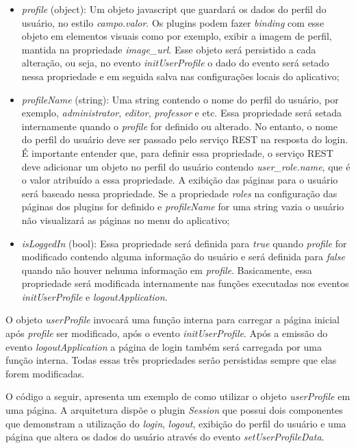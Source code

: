 \begin{itemize}
	\item \textit{profile} (object): Um objeto javascript que guardará os dados do perfil do usuário, no estilo \textit{campo.valor}. Os plugins podem fazer \textit{binding} com esse objeto em elementos visuais como por exemplo, exibir a imagem de perfil, mantida na propriedade \textit{image\_url}. Esse objeto será persistido a cada alteração, ou seja, no evento \textit{initUserProfile} o dado do evento será setado nessa propriedade e em seguida salva nas configurações locais do aplicativo;

	\item \textit{profileName} (string): Uma string contendo o nome do perfil do usuário, por exemplo, \textit{administrator}, \textit{editor}, \textit{professor} e etc. Essa propriedade será setada internamente quando o \textit{profile} for definido ou alterado. No entanto, o nome do perfil do usuário deve ser passado pelo serviço REST na resposta do login. É importante entender que, para definir essa propriedade, o serviço REST deve adicionar um objeto no perfil do usuário contendo \textit{user\_role.name}, que é o valor atribuído a essa propriedade. A exibição das páginas para o usuário será baseado nessa propriedade. Se a propriedade \textit{roles} na configuração das páginas dos plugins for definido e \textit{profileName} for uma string vazia o usuário não visualizará as páginas no menu do aplicativo;

	\item \textit{isLoggedIn} (bool): Essa propriedade será definida para \textit{true} quando \textit{profile} for modificado contendo alguma informação do usuário e será definida para \textit{false} quando não houver nehuma informação em \textit{profile}. Basicamente, essa propriedade será modificada internamente nas funções executadas nos eventos \textit{initUserProfile} e \textit{logoutApplication}.
\end{itemize}

O objeto \textit{userProfile} invocará uma função interna para carregar a página inicial após \textit{profile} ser modificado, após o evento \textit{initUserProfile}. Após a emissão do evento \textit{logoutApplication} a página de login também será carregada por uma função interna. Todas essas três propriedades serão persistidas sempre que elas forem modificadas.\par

O código a seguir, apresenta um exemplo de como utilizar o objeto \textit{userProfile} em uma página. A arquitetura dispõe o plugin \textit{Session} que possui dois componentes que demonstram a utilização do \textit{login}, \textit{logout}, exibição do perfil do usuário e uma página que altera os dados do usuário através do evento \textit{setUserProfileData}.

